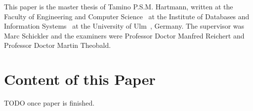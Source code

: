 This paper is the master thesis of Tamino P.S.M. Hartmann, written at the Faculty of Engineering and Computer Science~\cite{web:site:faculty} at the Institute of Databases and Information Systems~\cite{web:site:institute} at the University of Ulm~\cite{web:site:uni_ulm}, Germany.
The supervisor was Marc Schickler and the examiners were Professor Doctor Manfred Reichert and Professor Doctor Martin Theobald.

\section{Content of this Paper}

TODO once paper is finished.
